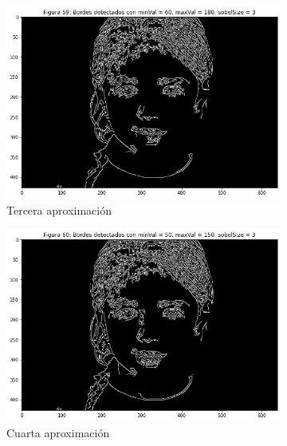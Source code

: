 \documentclass[11pt,twoside,titlepage,a4paper]{article}
\numberwithin{equation}{section} %
\theoremstyle{usual}
\begin{document}
\begin{figure}[h]
\begin{subfigure}[b]{.3\textwidth}
        \includegraphics[width=\textwidth]{imagenes/PoissonImageEditing_cell_70_output_2.png}
        \caption{Tercera aproximación}
        \label{fig:3Aprox}
    \end{subfigure}
    \centering
    \begin{subfigure}[b]{.3\textwidth}
        \centering
        \includegraphics[width=\textwidth]{imagenes/PoissonImageEditing_cell_70_output_3.png}
        \caption{Cuarta aproximación}
        \label{fig:4Aprox}
    \end{subfigure}%
    \centering
    \begin{subfigure}[b]{.3\textwidth}
        \centering

\end{subfigure}
\end{figure}
\end{document}
